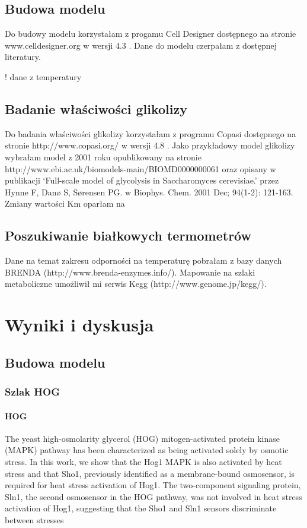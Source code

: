 \documentclass{pracamgr}
\begin{document}
\section{Budowa modelu}

Do budowy modelu korzystałam z progamu Cell Designer dostępnego na stronie www.celldesigner.org w wersji 4.3 . Dane do
modelu czerpałam z dostępnej literatury.

! dane z temperatury 

\section{Badanie właściwości glikolizy}

Do badania właściwości glikolizy korzystałam z programu Copasi dostępnego na stronie  http://www.copasi.org/ w wersji 4.8 .
Jako przykładowy model glikolizy wybrałam model z 2001 roku opublikowany na stronie http://www.ebi.ac.uk/biomodels-main/BIOMD0000000061
oraz opisany w publikacji `Full-scale model of glycolysis in Saccharomyces cerevisiae.' przez Hynne F, Danø S, Sørensen PG. w Biophys. Chem. 2001 Dec; 94(1-2): 121-163.
Zmiany wartości Km oparłam na %

\section{Poszukiwanie białkowych termometrów}

Dane na temat zakresu odporności na temperaturę pobrałam z bazy danych BRENDA (http://www.brenda-enzymes.info/). Mapowanie na szlaki
metaboliczne umożliwił mi serwis Kegg (http://www.genome.jp/kegg/).


\chapter{Wyniki i dyskusja}
\section{Budowa modelu}
\subsection{Szlak HOG}
\subsubsection{HOG}
The yeast high-osmolarity glycerol (HOG) mitogen-activated protein kinase (MAPK) pathway has been
characterized as being activated solely by osmotic stress. In this work, we show that the Hog1 MAPK is also
activated by heat stress and that Sho1, previously identified as a membrane-bound osmosensor, is required for
heat stress activation of Hog1. The two-component signaling protein, Sln1, the second osmosensor in the HOG
pathway, was not involved in heat stress activation of Hog1, suggesting that the Sho1 and Sln1 sensors
discriminate between stresses\cite{Winkler02}
\end{document}
